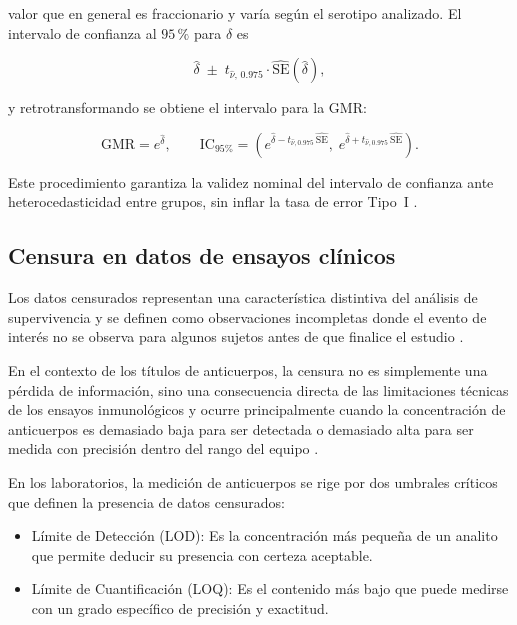 \noindent valor que en general es fraccionario y varía según el serotipo analizado. El intervalo de confianza al $95\,\%$ para $\delta$ es

\begin{equation}\label{eq:ic-welch}
	\hat{\delta} \;\pm\; t_{\hat{\nu},\,0.975} \cdot
	\widehat{\mathrm{SE}}(\hat{\delta}),
\end{equation}

\noindent y retrotransformando se obtiene el intervalo para la GMR:

\begin{equation}\label{eq:ic-gmr-sub}
	\mathrm{GMR} = e^{\hat{\delta}}, \qquad
	\mathrm{IC}_{95\%} = \left(e^{\hat{\delta} - t_{\hat{\nu},0.975}\,
		\widehat{\mathrm{SE}}},\;
	e^{\hat{\delta} + t_{\hat{\nu},0.975}\,\widehat{\mathrm{SE}}}\right).
\end{equation}

Este procedimiento garantiza la validez nominal del intervalo de confianza ante heterocedasticidad entre grupos, sin inflar la tasa de error Tipo~I \cite{Fuglsang2014}.

\subsection{Censura en datos de ensayos clínicos}

Los datos censurados representan una característica distintiva del análisis de supervivencia y se definen como observaciones incompletas donde el evento de interés no se observa para algunos sujetos antes de que finalice el estudio \cite{turkson}.

En el contexto de los títulos de anticuerpos, la censura no es simplemente una pérdida de información, sino una consecuencia directa de las limitaciones técnicas de los ensayos inmunológicos y ocurre principalmente cuando la concentración de anticuerpos es demasiado baja para ser detectada o demasiado alta para ser medida con precisión dentro del rango del equipo \cite{tran2021measuring}.

En los laboratorios, la medición de anticuerpos se rige por dos umbrales críticos que definen la presencia de datos censurados:
\begin{itemize}
	\item Límite de Detección (LOD): Es la concentración más pequeña de un analito que permite deducir su presencia con certeza aceptable.
	\item Límite de Cuantificación (LOQ): Es el contenido más bajo que puede medirse con un grado específico de precisión y exactitud.
\end{itemize}

